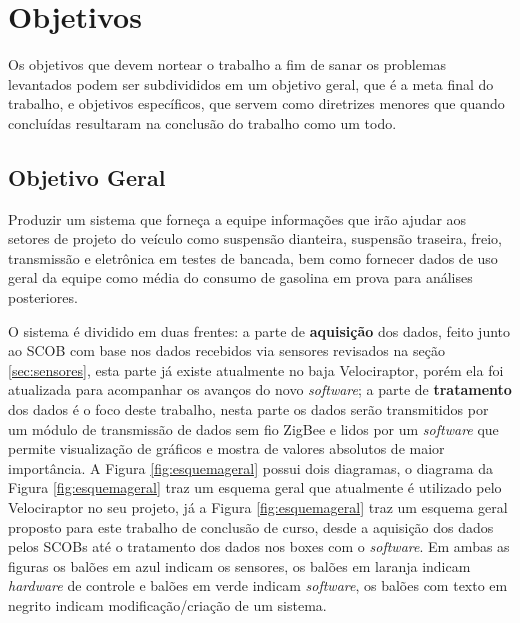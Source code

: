 \section{Objetivos}
\label{sec:objetivos}
Os objetivos que devem nortear o trabalho a fim de sanar os problemas levantados podem ser subdivididos em um objetivo geral, que é a meta final do trabalho, e objetivos específicos, que servem como diretrizes menores que quando concluídas resultaram na conclusão do trabalho como um todo.

\subsection{Objetivo Geral}

Produzir um sistema que forneça a equipe informações que irão ajudar aos setores de projeto do veículo como suspensão dianteira, suspensão traseira, freio, transmissão e eletrônica em testes de bancada, bem como fornecer dados de uso geral da equipe como média do consumo de gasolina em prova para análises posteriores. 

O sistema é dividido em duas frentes: a parte de \textbf{aquisição} dos dados, feito junto ao SCOB com base nos dados recebidos via sensores revisados na seção \ref{sec:sensores}, esta parte já existe atualmente no baja Velociraptor, porém ela foi atualizada para acompanhar os avanços do novo \textit{software}; a parte de \textbf{tratamento} dos dados é o foco deste trabalho, nesta parte os dados serão transmitidos por um módulo de transmissão de dados sem fio ZigBee e lidos por um \textit{software} que permite visualização de gráficos e mostra de valores absolutos de maior importância. A Figura \ref{fig:esquemageral} possui dois diagramas, o diagrama da Figura \ref{fig:esquemageral} traz um esquema geral que atualmente é utilizado pelo Velociraptor no seu projeto, já a Figura \ref{fig:esquemageral} traz um esquema geral proposto para este trabalho de conclusão de curso, desde a aquisição dos dados pelos SCOBs até o tratamento dos dados nos boxes com o \textit{software}. Em ambas as figuras os balões em azul indicam os sensores, os balões em laranja indicam \textit{hardware} de controle e balões em verde indicam \textit{software}, os balões com texto em negrito indicam modificação/criação de um sistema.         


